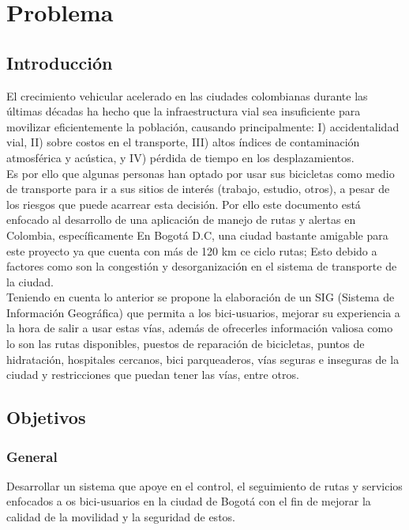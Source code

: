 \chapter{Problema}

\section{Introducción}

El crecimiento vehicular acelerado en las ciudades colombianas durante las últimas décadas ha hecho que la infraestructura vial sea insuficiente para movilizar eficientemente la población, causando principalmente: I) accidentalidad vial, II) sobre costos en el transporte, III) altos índices de contaminación atmosférica y acústica, y IV) pérdida de tiempo en los desplazamientos.\\
 
Es por ello que algunas personas han optado por usar sus bicicletas como medio de transporte para ir a sus sitios de interés (trabajo, estudio, otros), a pesar de los riesgos que puede acarrear esta decisión. 
Por ello este documento está enfocado al desarrollo de una aplicación de manejo de rutas y alertas en Colombia, específicamente En Bogotá D.C, una ciudad bastante amigable para este proyecto ya que cuenta con más de 120 km ce ciclo rutas; Esto debido a factores como son la congestión y desorganización en el sistema de transporte de la ciudad.\\

Teniendo en cuenta lo anterior se propone la elaboración de un SIG (Sistema de Información Geográfica) que permita a los bici-usuarios, mejorar su experiencia a la hora de salir a usar estas vías, además de ofrecerles información valiosa como lo son las rutas disponibles, puestos de reparación de bicicletas, puntos de hidratación, hospitales cercanos, bici parqueaderos, vías seguras e inseguras de la ciudad y restricciones que puedan tener las vías, entre otros.


\section{Objetivos}

\subsection{General}

Desarrollar un sistema que apoye en el control, el seguimiento de rutas y servicios enfocados a os bici-usuarios en la ciudad de Bogotá con el fin de mejorar la calidad de la movilidad y la seguridad de estos.

